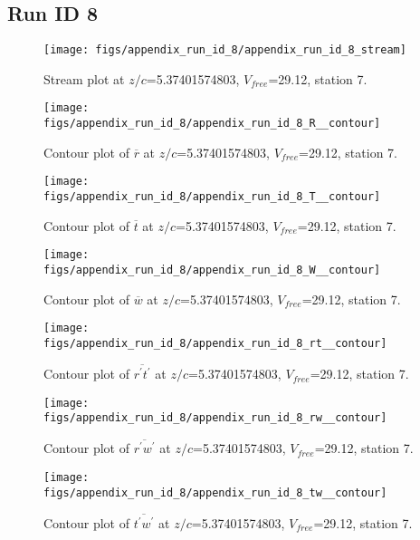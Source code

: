\subsection{Run ID 8}
\begin{figure}[H]
\centering
\texttt{[image: figs/appendix\_run\_id\_8/appendix\_run\_id\_8\_stream]}
\caption{Stream plot at $z/c$=5.37401574803, $V_{free}$=29.12, station 7.}
\label{fig:appendix_run_id_8_stream}
\end{figure}


\begin{figure}[H]
\centering
\texttt{[image: figs/appendix\_run\_id\_8/appendix\_run\_id\_8\_R\_\_contour]}
\caption{Contour plot of $\overline{r}$ at $z/c$=5.37401574803, $V_{free}$=29.12, station 7.}
\label{fig:appendix_run_id_8_R__contour}
\end{figure}


\begin{figure}[H]
\centering
\texttt{[image: figs/appendix\_run\_id\_8/appendix\_run\_id\_8\_T\_\_contour]}
\caption{Contour plot of $\overline{t}$ at $z/c$=5.37401574803, $V_{free}$=29.12, station 7.}
\label{fig:appendix_run_id_8_T__contour}
\end{figure}


\begin{figure}[H]
\centering
\texttt{[image: figs/appendix\_run\_id\_8/appendix\_run\_id\_8\_W\_\_contour]}
\caption{Contour plot of $\overline{w}$ at $z/c$=5.37401574803, $V_{free}$=29.12, station 7.}
\label{fig:appendix_run_id_8_W__contour}
\end{figure}


\begin{figure}[H]
\centering
\texttt{[image: figs/appendix\_run\_id\_8/appendix\_run\_id\_8\_rt\_\_contour]}
\caption{Contour plot of $\overline{r^\prime t^\prime}$ at $z/c$=5.37401574803, $V_{free}$=29.12, station 7.}
\label{fig:appendix_run_id_8_rt__contour}
\end{figure}


\begin{figure}[H]
\centering
\texttt{[image: figs/appendix\_run\_id\_8/appendix\_run\_id\_8\_rw\_\_contour]}
\caption{Contour plot of $\overline{r^\prime w^\prime}$ at $z/c$=5.37401574803, $V_{free}$=29.12, station 7.}
\label{fig:appendix_run_id_8_rw__contour}
\end{figure}


\begin{figure}[H]
\centering
\texttt{[image: figs/appendix\_run\_id\_8/appendix\_run\_id\_8\_tw\_\_contour]}
\caption{Contour plot of $\overline{t^\prime w^\prime}$ at $z/c$=5.37401574803, $V_{free}$=29.12, station 7.}
\label{fig:appendix_run_id_8_tw__contour}
\end{figure}


